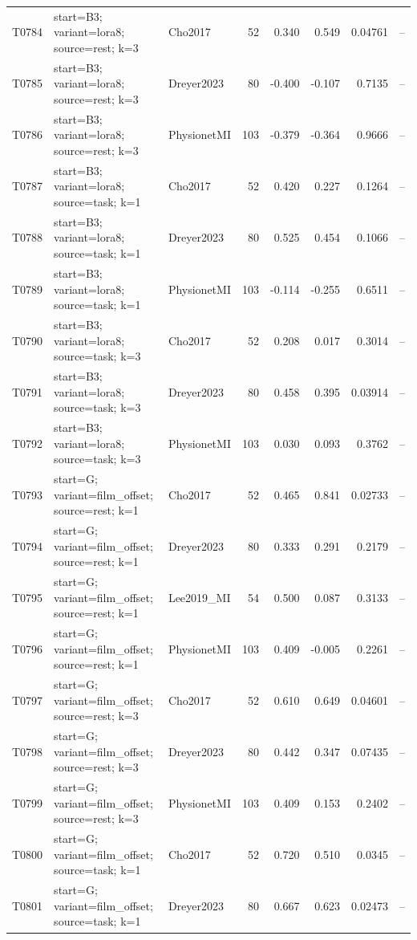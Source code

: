 \begin{longtable}{p{.45in}p{2.6in}p{.75in}rrrrr}
T0784 & start=B3; variant=lora8; source=rest; k=3 & Cho2017 & 52 & 0.340 & 0.549 & 0.04761 & -- \\
T0785 & start=B3; variant=lora8; source=rest; k=3 & Dreyer2023 & 80 & -0.400 & -0.107 & 0.7135 & -- \\
T0786 & start=B3; variant=lora8; source=rest; k=3 & PhysionetMI & 103 & -0.379 & -0.364 & 0.9666 & -- \\
T0787 & start=B3; variant=lora8; source=task; k=1 & Cho2017 & 52 & 0.420 & 0.227 & 0.1264 & -- \\
T0788 & start=B3; variant=lora8; source=task; k=1 & Dreyer2023 & 80 & 0.525 & 0.454 & 0.1066 & -- \\
T0789 & start=B3; variant=lora8; source=task; k=1 & PhysionetMI & 103 & -0.114 & -0.255 & 0.6511 & -- \\
T0790 & start=B3; variant=lora8; source=task; k=3 & Cho2017 & 52 & 0.208 & 0.017 & 0.3014 & -- \\
T0791 & start=B3; variant=lora8; source=task; k=3 & Dreyer2023 & 80 & 0.458 & 0.395 & 0.03914 & -- \\
T0792 & start=B3; variant=lora8; source=task; k=3 & PhysionetMI & 103 & 0.030 & 0.093 & 0.3762 & -- \\
T0793 & start=G; variant=film\_\allowbreak{}offset; source=rest; k=1 & Cho2017 & 52 & 0.465 & 0.841 & 0.02733 & -- \\
T0794 & start=G; variant=film\_\allowbreak{}offset; source=rest; k=1 & Dreyer2023 & 80 & 0.333 & 0.291 & 0.2179 & -- \\
T0795 & start=G; variant=film\_\allowbreak{}offset; source=rest; k=1 & Lee2019\_\allowbreak{}MI & 54 & 0.500 & 0.087 & 0.3133 & -- \\
T0796 & start=G; variant=film\_\allowbreak{}offset; source=rest; k=1 & PhysionetMI & 103 & 0.409 & -0.005 & 0.2261 & -- \\
T0797 & start=G; variant=film\_\allowbreak{}offset; source=rest; k=3 & Cho2017 & 52 & 0.610 & 0.649 & 0.04601 & -- \\
T0798 & start=G; variant=film\_\allowbreak{}offset; source=rest; k=3 & Dreyer2023 & 80 & 0.442 & 0.347 & 0.07435 & -- \\
T0799 & start=G; variant=film\_\allowbreak{}offset; source=rest; k=3 & PhysionetMI & 103 & 0.409 & 0.153 & 0.2402 & -- \\
T0800 & start=G; variant=film\_\allowbreak{}offset; source=task; k=1 & Cho2017 & 52 & 0.720 & 0.510 & 0.0345 & -- \\
T0801 & start=G; variant=film\_\allowbreak{}offset; source=task; k=1 & Dreyer2023 & 80 & 0.667 & 0.623 & 0.02473 & -- \\

\end{longtable}
